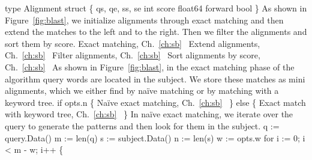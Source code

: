 type Alignment struct \{
          qs, qe, ss, se int
          score float64
          forward bool
\}
\nwendcode{}\nwdocspar
As shown in Figure~\ref{fig:blast}, we initialize alignments through
exact matching and then extend the matches to the left and to the
right. Then we filter the alignments and sort them by score.
\nwenddocs{}\endmoddef\nwstartdeflinemarkup{}\nwenddeflinemarkup
\LA{}Exact matching, Ch.~\ref{ch:sb}~{\nwtagstyle{}}\RA{}
\LA{}Extend alignments, Ch.~\ref{ch:sb}~{\nwtagstyle{}}\RA{}
\LA{}Filter alignments, Ch.~\ref{ch:sb}~{\nwtagstyle{}}\RA{}
\LA{}Sort alignments by score, Ch.~\ref{ch:sb}~{\nwtagstyle{}}\RA{}
\nwendcode{}\nwdocspar
As shown in Figure~\ref{fig:blast}, in the exact matching phase of the
algorithm query words are located in the subject. We store these
matches as mini alignments, which we either find by na\"ive matching
or by matching with a keyword tree.
\nwenddocs{}\endmoddef\nwstartdeflinemarkup{}\nwenddeflinemarkup
if opts.n \{
          \LA{}Na\"ive exact matching, Ch.~\ref{ch:sb}~{\nwtagstyle{}}\RA{}
\} else \{
          \LA{}Exact match with keyword tree, Ch.~\ref{ch:sb}~{\nwtagstyle{}}\RA{}
\}
\nwendcode{}\nwdocspar
In na\"ive exact matching, we iterate over the query to generate the
patterns and then look for them in the subject.
\nwenddocs{}\endmoddef\nwstartdeflinemarkup{}\nwenddeflinemarkup
q := query.Data()
m := len(q)
s := subject.Data()
n := len(s)
w := opts.w
for i := 0; i < m - w; i++ \{
